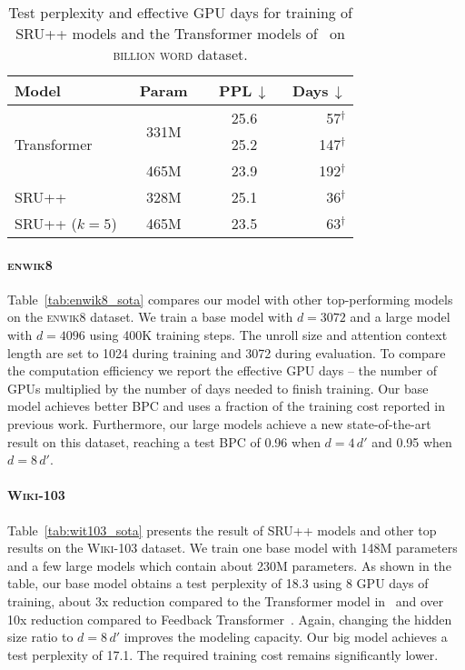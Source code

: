 \begin{table}[!t]
    \centering
    \begin{tabular}{lccr}
    \toprule
    \bf Model & \bf ~Param~ & \bf ~PPL$\,\downarrow$~ & \bf Days$\,\downarrow$\\
    \hline
    \multirow{3}{*}{Transformer} & \multirow{2}{*}{331M} & 25.6 & 57$^\dagger$\\
    & & 25.2 & 147$^\dagger$\\
    & 465M & 23.9 & 192$^\dagger$ \\
    \hline
    SRU++ & 328M & 25.1 & 36$^\dagger$\\
    SRU++ ($k=5$) & 465M & 23.5 & 63$^\dagger$\\
\bottomrule
    \end{tabular}
    \caption{Test perplexity and effective GPU days for training of SRU++ models and the Transformer models of~\citet{baevski2018adaptive} on \textsc{billion word} dataset.}
    \label{tab:1blm}
\end{table}

\paragraph{\textsc{enwik8}}
Table~\ref{tab:enwik8_sota} compares our model with other top-performing models on the \textsc{enwik8} dataset.
We train a base model with $d=3072$ and a large model with $d=4096$ using 400K training steps.
The unroll size and attention context length are set to 1024 during training and 3072 during evaluation.
To compare the computation efficiency we report the effective GPU days -- the number of GPUs multiplied by the number of days needed to finish training. 
Our base model achieves better BPC and uses a fraction of the training cost reported in previous work.
Furthermore, our large models achieve a new state-of-the-art result on this dataset, reaching a test BPC of 0.96 when $d=4\,d'$ and 0.95 when $d=8\,d'$. 


\paragraph{\textsc{Wiki-103}}
Table~\ref{tab:wit103_sota} presents the result of SRU++ models and other top results on the \textsc{Wiki-103} dataset. 
We train one base model with 148M parameters and a few large models which contain about 230M parameters.
As shown in the table, our base model obtains a test perplexity of 18.3 using 8 GPU days of training, about 3x reduction compared to the Transformer model in~\citet{baevski2018adaptive} and over 10x reduction compared to Feedback Transformer~\cite{fan2020accessing}.
Again, changing the hidden size ratio to $d=8\,d'$ improves the modeling capacity.
Our big model achieves a test perplexity of 17.1.
The required training cost remains significantly lower.


